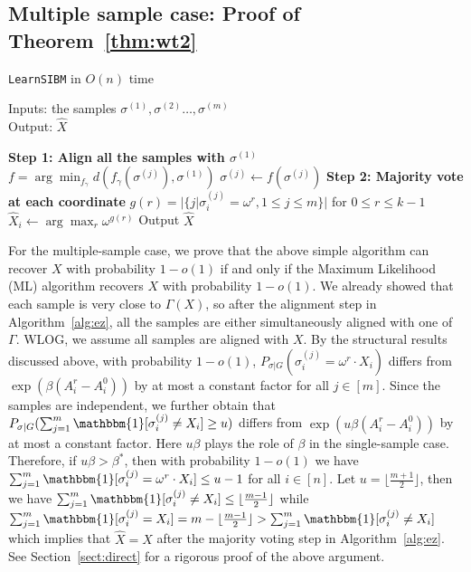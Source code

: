 \documentclass{article}
\begin{document}
\subsection{Multiple sample case: Proof of Theorem~\ref{thm:wt2}}
\label{sect:multi}

\begin{center}
	\begin{minipage}{.55\textwidth}
		\begin{algorithm}[H]
			\caption{\texttt{LearnSIBM} in $O(n)$ time} \label{alg:ez}
			Inputs: the samples $\sigma^{(1)},\sigma^{(2)}\dots,\sigma^{(m)}$ \\
			Output: $\hat{X}$
			\begin{algorithmic}[1]
				\Statex \hspace*{-0.3in} 
				{\bf Step 1: Align all the samples with $\sigma^{(1)}$ }
				\State $f=\arg\min_{f_{\gamma}} d(f_{\gamma}(\sigma^{(j)}), \sigma^{(1)})$
				\State $\sigma^{(j)} \gets f(\sigma^{(j)})$
				\EndFor
				\Statex \hspace*{-0.3in}
				{\bf Step 2: Majority vote at each coordinate}
				\State $g(r) = |\{j | \sigma^{(j)}_i = \omega^r,1\leq j \leq m\}|$ for $ 0 \leq r \leq k-1$
				\State $\hat{X}_i \gets  \arg\max_r \omega^{g(r)}$
				\State {}
				\EndFor
				\State Output $\hat{X}$
			\end{algorithmic}
		\end{algorithm}
	\end{minipage}
\end{center}
For the multiple-sample case, we prove that the above simple algorithm can recover $X$ with probability $1-o(1)$ if and only if the Maximum Likelihood (ML) algorithm recovers $X$ with probability $1-o(1)$. We already showed that each sample is very close to $\Gamma(X)$, so after the alignment step in Algorithm~\ref{alg:ez}, all the samples are either simultaneously aligned with one of $\Gamma$. WLOG, we assume all samples are aligned with $X$.
By the structural results discussed above,
with probability $1-o(1)$, $P_{\sigma|G}(\sigma_i^{(j)} = \omega^r \cdot X_i)$ differs from
$\exp (\beta (A^r_i-A^0_i))$ by at most a constant factor for all $j\in[m]$. Since the samples are independent, we further obtain that $P_{\sigma|G}(\sum_{j=1}^m\mathbbm{1}[\sigma_i^{(j)} \neq X_i]\ge u)$ differs from $ \exp ( u \beta (A^r_i-A^0_i))$
by at most a constant factor.
Here $u\beta$ plays the role of $\beta$ in the single-sample case.
Therefore, if $u\beta>\beta^\ast$, then with probability $1-o(1)$
we have $\sum_{j=1}^m\mathbbm{1}[\sigma_i^{(j)}= \omega^r \cdot X_i] \le u-1$ for all $i\in[n]$.
Let $u=\lfloor \frac{m+1}{2} \rfloor$,
then we have $\sum_{j=1}^m\mathbbm{1}[\sigma_i^{(j)} \neq  X_i] \le \lfloor \frac{m-1}{2} \rfloor $
while $\sum_{j=1}^m\mathbbm{1}[\sigma_i^{(j)} = X_i]
= m - \lfloor \frac{m-1}{2} \rfloor > \sum_{j=1}^m\mathbbm{1}[\sigma_i^{(j)} \neq  X_i]$
which implies that $\hat{X}=X$ after the majority voting step in Algorithm~\ref{alg:ez}. See Section~\ref{sect:direct} for a rigorous proof of the above argument.
\end{document}
